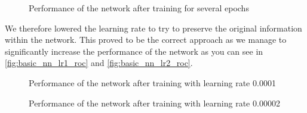 \begin{figure}
    \centering
    \def\svgwidth{\columnwidth}
    
    \caption{Performance of the network after training for several epochs}
    \label{fig:basic_nn_overfit_roc}
\end{figure}

We therefore lowered the learning rate to try to preserve the original information within the network. This proved to be the correct approach as we manage to significantly increase the performance of the network as you can see in \autoref{fig:basic_nn_lr1_roc} and \autoref{fig:basic_nn_lr2_roc}.

\begin{figure}
    \centering
    \def\svgwidth{\columnwidth}
    
    \caption{Performance of the network after training with learning rate 0.0001}
    \label{fig:basic_nn_lr1_roc}
\end{figure}

\begin{figure}
    \centering
    \def\svgwidth{\columnwidth}
    
    \caption{Performance of the network after training with learning rate 0.00002}
    \label{fig:basic_nn_lr2_roc}
\end{figure}